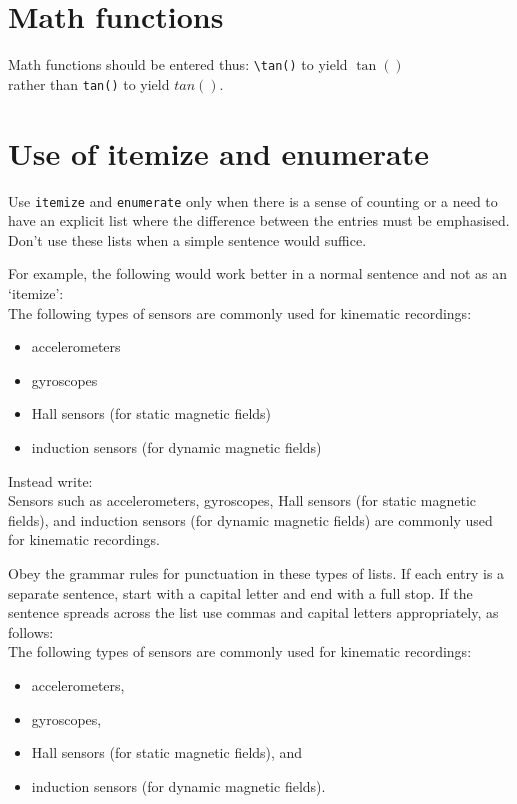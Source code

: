 \documentclass[english]{workpackage}[1996/06/02]
\begin{document}
\section{Math functions}
\label{sec:Mathfunctions}

Math functions should be entered thus: \verb+\tan()+ to yield $\tan()$ \\
rather than \verb+tan()+ to yield $tan()$.

\section{Use of itemize and enumerate}
\label{sec:Useofitemizeandenumerate}

Use \verb+itemize+ and \verb+enumerate+ only when there is a sense of counting or a need to have an explicit list where the difference between the entries must be emphasised. Don't use these lists when a simple sentence would suffice.

For example, the following would work better in a normal sentence and not as an `itemize':\\
The following types of sensors are commonly used for kinematic recordings:
\begin{itemize}
\item accelerometers
\item gyroscopes
\item Hall sensors (for static magnetic fields)
\item induction sensors (for dynamic magnetic fields)
\end{itemize}
Instead write:\\
Sensors such as accelerometers, gyroscopes, Hall sensors (for static magnetic fields), and induction sensors (for dynamic magnetic fields) are commonly used for kinematic recordings.

Obey the grammar rules for punctuation in these types of lists. If each entry is a separate sentence, start with a capital letter and end with a full stop.  If the sentence spreads across the list use commas and capital letters appropriately, as follows:\\
The following types of sensors are commonly used for kinematic recordings:
\begin{itemize}
\item accelerometers,
\item gyroscopes,
\item Hall sensors (for static magnetic fields), and
\item induction sensors (for dynamic magnetic fields).
\end{itemize}
\end{document}

